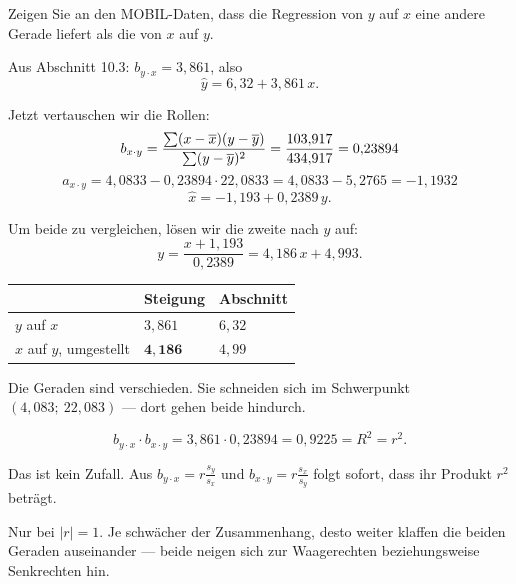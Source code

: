 \begin{aufgabe}
Zeigen Sie an den MOBIL-Daten, dass die Regression von $y$ auf $x$ eine andere Gerade liefert als die von $x$ auf $y$.

\loesung
{}
Aus Abschnitt 10.3: $b_{y\cdot x} = 3{,}861$, also
\[ \hat y = 6{,}32 + 3{,}861\,x . \]

Jetzt vertauschen wir die Rollen:
\[ b_{x\cdot y} = \frac{\sum(x-\overline{x})(y-\overline y)}{\sum(y-\overline y)^2} = \frac{103{,}917}{434{,}917} = 0{,}23894 \]
\[ a_{x\cdot y} = 4{,}0833 - 0{,}23894 \cdot 22{,}0833 = 4{,}0833 - 5{,}2765 = -1{,}1932 \]
\[ \hat x = -1{,}193 + 0{,}2389\,y . \]

Um beide zu vergleichen, lösen wir die zweite nach $y$ auf:
\[ y = \frac{x + 1{,}193}{0{,}2389} = 4{,}186\,x + 4{,}993 . \]

\begin{center}
\renewcommand{\arraystretch}{1.48}
\begin{tabular}{@{}P{3.4cm}P{2.0cm}P{2.4cm}@{}}
\toprule
& \textbf{Steigung} & \textbf{Abschnitt}\\
\midrule
$y$ auf $x$ & $3{,}861$ & $6{,}32$\\
$x$ auf $y$, umgestellt & $\mathbf{4{,}186}$ & $4{,}99$\\
\bottomrule
\end{tabular}
\end{center}

Die Geraden sind verschieden. Sie schneiden sich im Schwerpunkt $(4{,}083;\ 22{,}083)$ --- dort gehen beide hindurch.

\[ b_{y\cdot x} \cdot b_{x\cdot y} = 3{,}861 \cdot 0{,}23894 = 0{,}9225 = R^2 = r^2 . \]

Das ist kein Zufall. Aus $b_{y\cdot x} = r\frac{s_y}{s_x}$ und $b_{x\cdot y} = r\frac{s_x}{s_y}$ folgt sofort, dass ihr Produkt $r^2$ beträgt.

Nur bei $|r| = 1$. Je schwächer der Zusammenhang, desto weiter klaffen die beiden Geraden auseinander --- beide neigen sich zur Waagerechten beziehungsweise Senkrechten hin.

\begin{center}
\begin{minipage}{0.88\textwidth}
\end{minipage}
\end{center}
\end{aufgabe}

